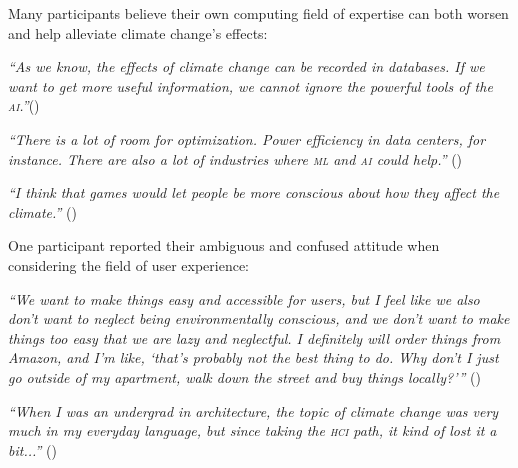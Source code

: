     Many participants believe their own computing field of expertise can both worsen and help alleviate climate change's effects: %
        
    
    \begin{quoting}
        \textit{
        ``As we know, the effects of climate change can be recorded in databases. If we want to get more useful information, we cannot ignore the powerful tools of the \textsc{ai}.''}()
    \end{quoting}
    
    \begin{quoting}
        \textit{
        ``There is a lot of room for optimization. Power efficiency in data centers, for instance. There are also a lot of industries where \textsc{ml} and \textsc{ai} could help.''
        }  ()
    \end{quoting}
    
    \begin{quoting}
        \textit{
        ``I think that games would let people be more conscious about how they affect the climate.''
        }()
    \end{quoting}
    
    One participant reported their ambiguous and confused attitude when considering the field of user experience:
    
    \begin{quoting}
        \textit{
        ``We want to make things easy and accessible for users, but I feel like we also don't want to neglect being environmentally conscious, and we don't want to make things too easy that we are lazy and neglectful. I definitely will order things from Amazon, and I'm like, `that's probably not the best thing to do. Why don't I just go outside of my apartment, walk down the street and buy things locally?'\thinspace''  %
        }()
    \end{quoting}
    
    \begin{quoting}
        \textit{
        ``When I was an undergrad in architecture, the topic of climate change was very much in my everyday language, but since taking the \textsc{hci} path, it kind of lost it a bit...''        }()
    \end{quoting}
    
